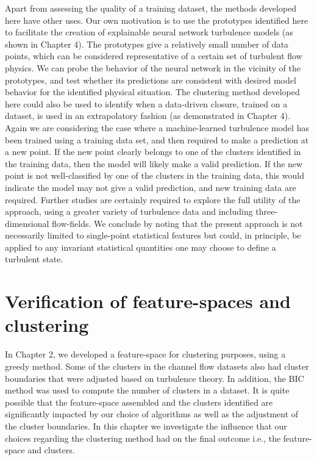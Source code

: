 Apart from assessing the quality of a training dataset, the methods developed here have other uses. Our
own motivation is to use the prototypes identiﬁed here to facilitate the creation of explainable neural
network turbulence models (as shown in Chapter 4). The prototypes give a relatively small number of data
points, which can be considered representative of a certain set of turbulent ﬂow physics. We can probe the
behavior of the neural network in the vicinity of the prototypes, and test whether its predictions are
consistent with desired model behavior for the identiﬁed physical situation. The clustering method
developed here could also be used to identify when a data-driven closure, trained on a dataset, is used in an
extrapolatory fashion (as demonstrated in Chapter 4). Again we are considering the case where a
machine-learned turbulence model has been trained using a training data set, and then required to make a
prediction at a new point. If the new point clearly belongs to one of the clusters identiﬁed in the training
data, then the model will likely make a valid prediction. If the new point is not well-classiﬁed by one of the
clusters in the training data, this would indicate the model may not give a valid prediction, and new training
data are required. Further studies are certainly required to explore the full utility of the approach, using a
greater variety of turbulence data and including three-dimensional ﬂow-ﬁelds. We conclude by noting that
the present approach is not necessarily limited to single-point statistical features but could, in principle, be
applied to any invariant statistical quantities one may choose to deﬁne a turbulent state.

\section{Verification of feature-spaces and clustering}

In Chapter 2, we developed a feature-space for clustering purposes, using a greedy method. Some of the
clusters in the channel ﬂow datasets also had cluster boundaries that were adjusted based on turbulence
theory. In addition, the BIC method was used to compute the number of clusters in a dataset. It is quite
possible that the feature-space assembled and the clusters identiﬁed are signiﬁcantly impacted by our
choice of algorithms as well as the adjustment of the cluster boundaries. In this chapter we investigate the inﬂuence that our choices regarding the clustering method had on the ﬁnal outcome i.e., the feature-space and clusters.

